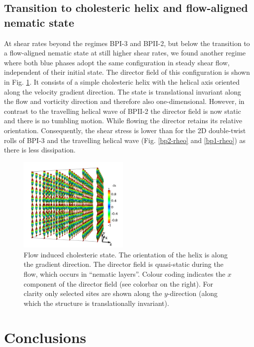 \documentclass[8.5pt,twoside,twocolumn]{article}
\begin{document}
{\subsection{Transition to cholesteric helix and flow-aligned nematic state}\label{cholflow}

At shear rates beyond the regimes BPI-3 and BPII-2, but below the transition to a 
flow-aligned nematic state at still higher shear rates, we found another regime where 
both blue phases adopt the same configuration in steady shear flow, 
independent of their initial state.
The director field of this configuration is shown in Fig. \ref{fig:cholflow}.
It consists of a simple cholesteric helix with the helical axis oriented 
along the velocity gradient direction. The state is translational invariant 
along the flow and vorticity direction and therefore also one-dimensional. 
However, in contrast to the travelling helical wave of BPII-2 the 
director field is now static and there is no tumbling motion. 
While flowing the director retains its relative orientation.
Consequently, the shear stress is lower than for
the 2D double-twist rolls of BPI-3 and the travelling helical wave
(Fig. \ref{bp2-rheo} and \ref{bp1-rheo}) as there is less dissipation.
 
\begin{figure}[htpb]
\includegraphics[width=0.475\textwidth]{dir3d+y-200k_run1179r.png}
\caption{Flow induced cholesteric state. The orientation of the helix is 
along the gradient direction. The director field is quasi-static during 
the flow, which occurs in ``nematic layers''. Colour coding indicates the 
$x$ component of the director field (see colorbar on the right).
For clarity only selected sites are shown along the $y$-direction (along which
the structure is translationally invariant).}
\label{fig:cholflow}
\end{figure}




\section{Conclusions}

}
\end{document}
